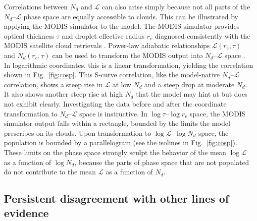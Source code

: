 \documentclass[acp, manuscript]{copernicus}\usepackage[]{graphicx}\usepackage[]{xcolor}
\newcommand\nd{\ensuremath{N_d}}
\newcommand\lwp{\ensuremath{\mathcal L}}
\newcommand\re{\ensuremath{r_e}}
\begin{document}
Correlations between \nd{} and \lwp{}
can also arise simply because not all parts of the \nd--\lwp{} phase space are equally
accessible to clouds.   This can be illustrated by applying the 
MODIS simulator \citep{Pincus2012} to the model.  The MODIS simulator
provides optical thickness $\tau$ and droplet effective radius $r_e$ diagnosed consistently with the MODIS satellite cloud retrievals \citep{platnick2017}.
Power-law adiabatic relationships $\lwp(\re,\tau)$ and
$\nd(\re,\tau)$ can be used to transform the MODIS output into
\nd--\lwp{} space \citep[e.g., ][]{dipu2022}.  In logarithmic coordinates, this is a linear transformation, yielding the correlation shown in
Fig.~\ref{fig:cosp}.  This S-curve correlation, like the model-native
\nd--\lwp{} correlation, shows a steep rise in \lwp{} at low \nd{} and a steep
drop at moderate \nd{}.  It also shows another steep rise at high
\nd{} that the model may hint at but does not exhibit clearly.  
Investigating the data before and after the coordinate transformation
to \nd--\lwp{} space is instructive.  In $\log\tau$--$\log r_e$ space,
the MODIS simulator output 
falls within a rectangle, bounded by the limits the model prescribes
on its clouds.  Upon transformation to $\log\lwp$--$\log\nd$
space, the population is bounded by a parallelogram (see the isolines
in Fig.~\ref{fig:cosp}).
These limits on the phase space strongly sculpt the behavior of the mean
$\log\lwp$ as a function of $\log\nd$, because the parts of phase
space that are not populated do not contribute to the mean $\lwp$ as a
function of \nd.    %

\subsection{Persistent disagreement with other lines of evidence}
\label{sec:pers-disagr}
\end{document}
